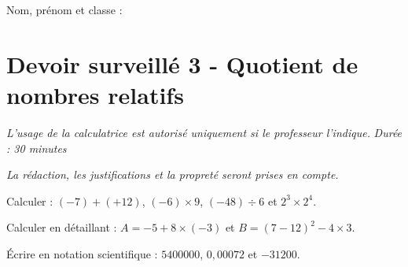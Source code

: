 \documentclass[a4paper,10pt]{report}
\begin{document}
\pagestyle{empty}
\noindent Nom, prénom et classe : \dotfill

\section*{Devoir surveillé 3 - Quotient de nombres relatifs}

\noindent \textit{L'usage de la calculatrice est autorisé uniquement si le professeur l'indique.} \hfill \textit{Durée : 30 minutes}

\medskip
\noindent \textit{La rédaction, les justifications et la propreté seront prises en compte.}


\begin{ex}[Calculs]
Calculer : $(-7)+(+12)$, $(-6)\times 9$, $(-48)\div 6$ et $2^3\times2^4$.
\medskip\noindent\grandscarreaux{\linewidth}{4cm}
\end{ex}
\begin{ex}[Priorités]
Calculer en détaillant : $A=-5+8\times(-3)$ et $B=(7-12)^2-4\times3$.
\medskip\noindent\grandscarreaux{\linewidth}{4cm}
\end{ex}
\begin{ex}
Écrire en notation scientifique : $5400000$, $0,00072$ et $-31200$.
\medskip\noindent\grandscarreaux{\linewidth}{3cm}
\end{ex}
\end{document}
